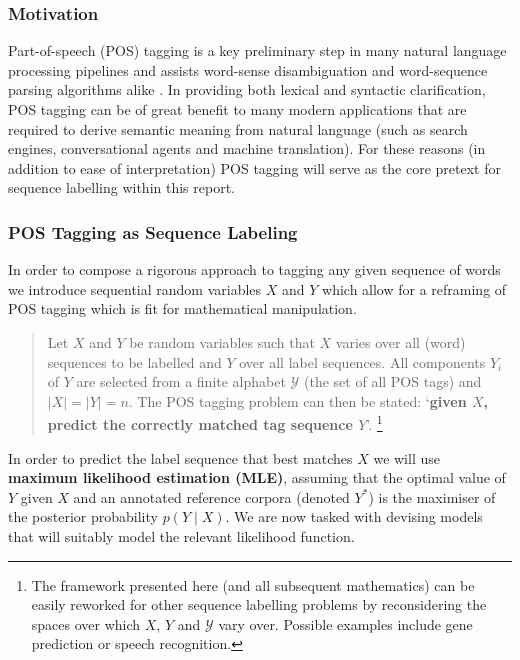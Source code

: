 \documentclass[../main.tex]{subfiles}
\begin{document}
\subsubsection{Motivation}
Part-of-speech (POS) tagging is a key preliminary step in many natural language processing pipelines and assists word-sense disambiguation and word-sequence parsing algorithms alike \autocite{allen-nlu-1995}.
In providing both lexical and syntactic clarification, POS tagging can be of great benefit to many modern applications that are required to derive semantic meaning from natural language (such as search engines, conversational agents and machine translation).
For these reasons (in addition to ease of interpretation) POS tagging will serve as the core pretext for sequence labelling within this report.

\subsubsection{POS Tagging as Sequence Labeling}

In order to compose a rigorous approach to tagging any given sequence of words we introduce sequential random variables $X$ and $Y$ which allow for a reframing of POS tagging which is fit for mathematical manipulation.

\begin{quote}
Let $X$ and $Y$ be random variables such that $X$ varies over all (word) sequences to be labelled and $Y$ over all label sequences.
All components $Y_i$ of $Y$ are selected from a finite alphabet $\mathcal{Y}$ (the set of all POS tags) and $|X|=|Y|=n$.
The POS tagging problem can then be stated:
`\textbf{given $X$, predict the correctly matched tag sequence $Y$}'.
\footnote{The framework presented here (and all subsequent mathematics) can be easily reworked for other sequence labelling problems by reconsidering the spaces over which $X$, $Y$ and $\mathcal{Y}$ vary over. Possible examples include gene prediction or speech recognition.}
\end{quote}

In order to predict the label sequence that best matches $X$ we will use \textbf{maximum likelihood estimation (MLE)}, assuming that the 
optimal value of $Y$ given $X$ and an annotated reference corpora (denoted $Y^*$) is the maximiser of the posterior probability $p(Y \mid X)$.
We are now tasked with devising models that will suitably model the relevant likelihood function.
\end{document}
